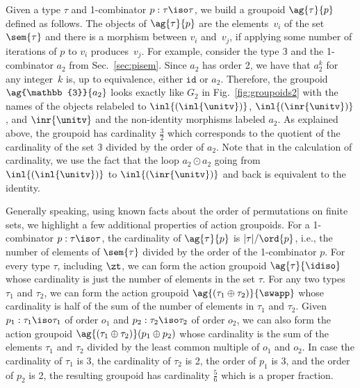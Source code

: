 Given a type $\tau$ and 1-combinator $p : \tau \iso \tau$, we build a
groupoid $\ag{\tau}{p}$ defined as follows. The objects of
$\ag{\tau}{p}$ are the elements~$v_i$ of the set $\sem{\tau}$ and there
is a morphism between $v_i$ and~$v_j$, if applying some number of
iterations of $p$ to $v_i$ produces~$v_j$. For example, consider the
type $\mathbb{3}$ and the 1-combinator $a_2$ from
Sec.~\ref{sec:pisem}. Since $a_2$ has order 2, we have that $a_2 ^ k$
for any integer~$k$ is, up to equivalence, either $\texttt{id}$ or
$a_2$. Therefore, the groupoid $\ag{\mathbb{3}}{a_2}$ looks exactly like
$G_2$ in Fig.~\ref{fig:groupoids2} with the names of the objects
relabeled to $\inl{(\inl{\unitv})}$, $\inl{(\inr{\unitv})}$, and
$\inr{\unitv}$ and the non-identity morphisms labeled $a_2$. As
explained above, the groupoid has cardinality $\frac{3}{2}$ which
corresponds to the quotient of the cardinality of the set $\mathbb{3}$
divided by the order of $a_2$. Note that in the calculation of
cardinality, we use the fact that the loop $a_2 \odot a_2$ going from
$\inl{(\inl{\unitv})}$ to $\inl{(\inr{\unitv})}$ and back is equivalent
to the identity.

Generally speaking, using known facts about the order of permutations
on finite sets, we highlight a few additional properties of action
groupoids. For a 1-combinator $p : \tau \iso \tau$, the cardinality of
$\ag{\tau}{p}$ is $|\tau|/\ord{p}$, i.e., the number of elements of
$\sem{\tau}$ divided by the order of the 1-combinator $p$.  For every
type $\tau$, including $\zt$, we can form the action groupoid
$\ag{\tau}{\idiso}$ whose cardinality is just the number of elements
in the set $\tau$. For any two types $\tau_1$ and $\tau_2$, we can
form the action groupoid $\ag{(\tau_1\oplus\tau_2)}{\swapp}$ whose
cardinality is half of the sum of the number of elements in $\tau_1$
and $\tau_2$. Given $p_1 : \tau_1 \iso \tau_1$ of order $o_1$ and
$p_2 : \tau_2 \iso \tau_2$ of order $o_2$, we can also form the action
groupoid $\ag{(\tau_1\oplus\tau_2)}({p_1\oplus p_2)}$ whose cardinality is
the sum of the elements $\tau_1$ and $\tau_2$ divided by the least
common multiple of $o_1$ and $o_2$. In case the cardinality of
$\tau_1$ is 3, the cardinality of $\tau_2$ is 2, the order of $p_1$ is
3, and the order of $p_2$ is 2, the resulting groupoid has cardinality
$\frac{5}{6}$ which is a proper fraction.


